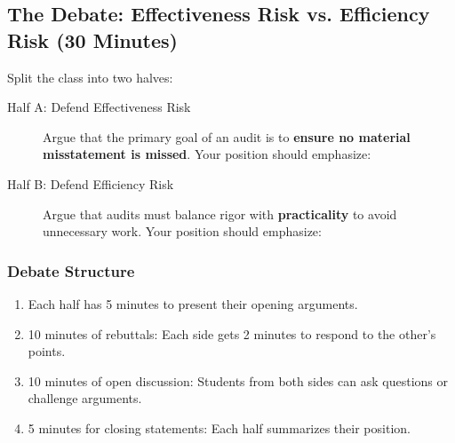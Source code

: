 \documentclass[12pt,a4paper]{memoir}
\begin{document}
\subsection*{The Debate: Effectiveness Risk vs. Efficiency Risk (30 Minutes)}
Split the class into two halves:
\begin{description}
    \item[Half A: Defend Effectiveness Risk] Argue that the primary goal of an audit is to \textbf{ensure no material misstatement is missed}. Your position should emphasize:

    \item[Half B: Defend Efficiency Risk] Argue that audits must balance rigor with \textbf{practicality} to avoid unnecessary work. Your position should emphasize:
\end{description}

\subsubsection*{Debate Structure}
\begin{enumerate}
    \item Each half has 5 minutes to present their opening arguments.
    \item 10 minutes of rebuttals: Each side gets 2 minutes to respond to the other’s points.
    \item 10 minutes of open discussion: Students from both sides can ask questions or challenge arguments.
    \item 5 minutes for closing statements: Each half summarizes their position.
\end{enumerate}
\end{document}
